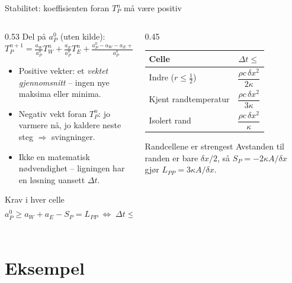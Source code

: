 \documentclass[11pt,aspectratio=169]{beamer}
\begin{document}
\begin{frame}{Stabilitet: koeffisienten foran $T_P^n$ må være positiv}
\begin{columns}[c]
\begin{column}{0.53\textwidth}
\footnotesize
Del på $a_P^0$ (uten kilde):
\[
T_P^{n+1} = \tfrac{a_W}{a_P^0}T_W^n + \tfrac{a_E}{a_P^0}T_E^n + \tfrac{a_P^0 - a_W - a_E + S_P}{a_P^0}T_P^n
\]
\begin{itemize}
\item Positive vekter: et \emph{vektet gjennomsnitt} -- ingen nye maksima eller minima.
\item Negativ vekt foran $T_P^n$: jo varmere nå, jo kaldere neste steg $\Rightarrow$ svingninger.
\item Ikke en matematisk nødvendighet -- ligningen har en løsning uansett $\Delta t$.
\end{itemize}
\begin{oppsumb}{Krav i hver celle}
\[
a_P^0 \ge a_W + a_E - S_P = L_{PP}
\;\Longleftrightarrow\;
\Delta t \le \frac{\rho c\,\Delta V}{L_{PP}}
\]
\end{oppsumb}
\end{column}
\begin{column}{0.45\textwidth}
\footnotesize
\setlength{\tabcolsep}{4pt}
\begin{tabular}{@{}lc@{}}
\toprule
Celle & $\Delta t \le$ \\
\midrule
Indre ($r\le\frac12$) & $\dfrac{\rho c\,\delta x^2}{2\kappa}$ \\[3mm]
Kjent randtemperatur & $\dfrac{\rho c\,\delta x^2}{3\kappa}$ \\[3mm]
Isolert rand & $\dfrac{\rho c\,\delta x^2}{\kappa}$ \\
\bottomrule
\end{tabular}
\begin{remb}{Randcellene er strengest}
Avstanden til randen er bare $\delta x/2$, så $S_P = -2\kappa A/\delta x$ gjør $L_{PP} = 3\kappa A/\delta x$.
\end{remb}
\end{column}
\end{columns}
\end{frame}

\section{Eksempel}
\end{document}
